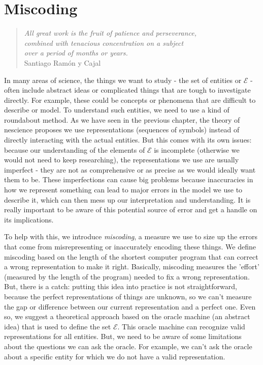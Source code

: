 %
%


\chapter{Miscoding}
\label{chap:Miscoding}

\begin{quote}
    \begin{flushright}
        \emph{All great work is the fruit of patience and perseverance,\\
            combined with tenacious concentration on a subject\\
            over a period of months or years.}\\
        Santiago Ramón y Cajal
    \end{flushright}
\end{quote}
\bigskip

In many areas of science, the things we want to study - the set of entities or $\mathcal{E}$ - often include abstract ideas or complicated things that are tough to investigate directly. For example, these could be concepts or phenomena that are difficult to describe or model. To understand such entities, we need to use a kind of roundabout method. As we have seen in the previous chapter, the theory of nescience proposes we use representations (sequences of symbols) instead of directly interacting with the actual entities. But this comes with its own issues: because our understanding of the elements of $\mathcal{E}$ is incomplete (otherwise we would not need to keep researching), the representations we use are usually imperfect - they are not as comprehensive or as precise as we would ideally want them to be. These imperfections can cause big problems because inaccuracies in how we represent something can lead to major errors in the model we use to describe it, which can then mess up our interpretation and understanding. It is really important to be aware of this potential source of error and get a handle on its implications.

To help with this, we introduce \emph{miscoding}, a measure we use to size up the errors that come from misrepresenting or inaccurately encoding these things. We define miscoding based on the length of the shortest computer program that can correct a wrong representation to make it right. Basically, miscoding measures the 'effort' (measured by the length of the program) needed to fix a wrong representation. But, there is a catch: putting this idea into practice is not straightforward, because the perfect representations of things are unknown, so we can't measure the gap or difference between our current representation and a perfect one. Even so, we suggest a theoretical approach based on the oracle machine (an abstract idea) that is used to define the set $\mathcal{E}$. This oracle machine can recognize valid representations for all entities. But, we need to be aware of some limitations about the questions we can ask the oracle. For example, we can't ask the oracle about a specific entity for which we do not have a valid representation.

